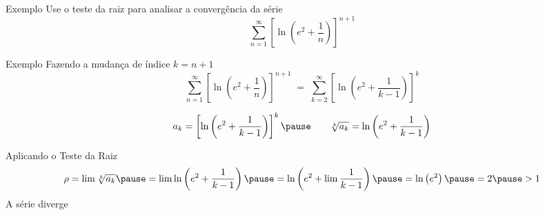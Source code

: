 \addtocounter{exemplo}{1}
\begin{frame}{Exemplo \theexemplo}
  Use o teste da raiz para analisar a convergência da série
  \[
    \sum_{n=1}^\infty \left[\ln\left(e^2+\frac{1}{n}\right)\right]^{n+1}
  \]
\end{frame}

\begin{frame}{Exemplo \theexemplo}
  Fazendo a mudança de índice \(k=n+1\)
  \[
    \sum_{n=1}^\infty \left[\ln\left(e^2+\frac{1}{n}  \right)\right]^{n+1} \;=\;
    \sum_{k=2}^\infty \left[\ln\left(e^2+\frac{1}{k-1}\right)\right]^{k}
  \]

  \pause
  \[
    a_k
    = \left[\ln\left( e^2 + \frac{1}{k-1} \right)\right]^k
    \pause
    \qquad
    \sqrt[k]{a_k}
    = \ln\left(e^2+\frac{1}{k-1}\right)
  \]

  \pause
  Aplicando o Teste da Raiz
  \[
    \rho
    = \lim \sqrt[k]{a_k}
    \pause
    = \lim \ln\left(e^2+\frac{1}{k-1}\right)
    \pause
    = \ln \left(e^2+ \lim\frac{1}{k-1}\right)
    \pause
    = \ln \left(e^2\right)
    \pause
    = 2
    \pause
    > 1
  \]
  A série diverge
\end{frame}

\begin{frame}{\contentsname}
  \tableofcontents
\end{frame}


